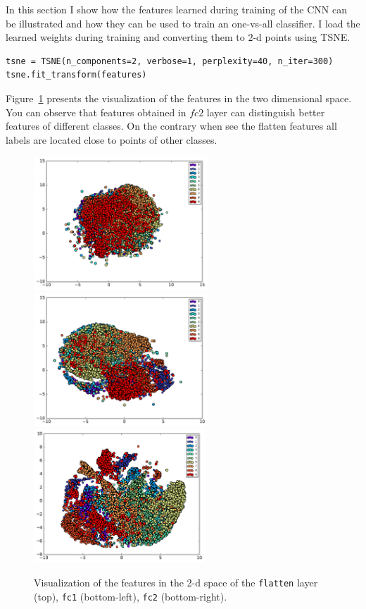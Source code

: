 \documentclass{article}
\begin{document}
In this section I show how the features learned during training of the CNN can be illustrated and how they can be used to train an one-vs-all classifier.
I load the learned weights during training and converting them to $2$-d points using TSNE.
\begin{verbatim}
tsne = TSNE(n_components=2, verbose=1, perplexity=40, n_iter=300)
tsne.fit_transform(features)
\end{verbatim}
Figure~\ref{fig:7} presents the visualization of the features in the two dimensional space. 
You can observe that features obtained in $fc2$ layer can distinguish better features of different classes.
On the contrary when see the flatten features all labels are located close to points of other classes.
\begin{figure}[h!]
\centering
\includegraphics[height=5.0cm]{visualization-linear-features_flatten.pdf}
\includegraphics[height=5.0cm]{visualization-linear-features_fc1.pdf}
\includegraphics[height=5.0cm]{visualization-linear-features_fc2.pdf}
\caption{Visualization of the features in the 2-d space of the \texttt{flatten} layer (top), \texttt{fc1} (bottom-left), \texttt{fc2} (bottom-right).}
\label{fig:7}
\end{figure}
\end{document}
